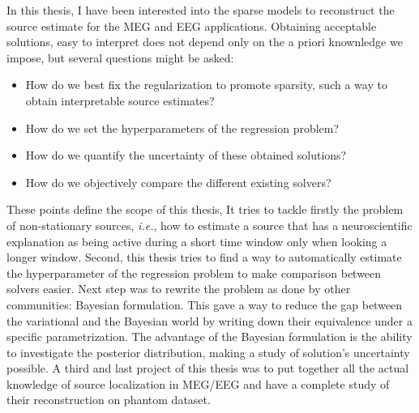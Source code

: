 In this thesis, I have been interested into the sparse models to reconstruct the source estimate for the MEG and EEG applications. Obtaining acceptable solutions, easy to interpret does not depend only on the a priori knownledge we impose, but several questions might be asked:
\begin{itemize}
\item How do we best fix the regularization to promote sparsity, such a way to obtain interpretable source estimates?
\item How do we set the hyperparameters of the regression problem?
\item How do we quantify the uncertainty of these obtained solutions?
\item How do we objectively compare the different existing solvers?
\end{itemize}
These points define the scope of this thesis, It tries to tackle firstly the problem of non-stationary sources, \textit{i.e.}, how to estimate a source that has a neuroscientific explanation as being active during a short time window only when looking a longer window. Second, this thesis tries to find a way to automatically estimate the hyperparameter of the regression problem to make comparison between solvers easier. Next step was to rewrite the problem as done by other communities: Bayesian formulation. This gave a way to reduce the gap between the variational and the Bayesian world by writing down their equivalence under a specific parametrization. The advantage of the Bayesian formulation is the ability to investigate the posterior distribution, making a study of solution's uncertainty possible. A third and last project of this thesis was to put together all the actual knowledge of source localization in MEG/EEG and have a complete study of their reconstruction on phantom dataset.

